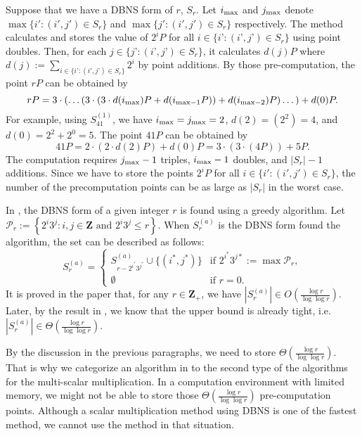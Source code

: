 Suppose that we have a DBNS form of $r$, $S_r$. Let $i_{\rm max}$ and $j_{\rm max}$ denote $\max\{ i' : (i',j') \in S_r \}$ and $\max\{ j' : (i',j') \in S_r \}$ respectively. The method calculates and stores the value of $2^iP$ for all $i \in \{i’ : (i’, j’) \in S_r \}$ using point doubles. Then, for each $j \in \{j’ : (i’, j’) \in S_r \}$, it calculates $d(j)P$ where $d(j) := \sum\limits_{i \in \{i’ : (i',j’) \in S_r\}} 2^i $ by point additions. By those pre-computation, the point $rP$ can be obtained by
$$rP = 3\cdot \left( \dots \left( 3 \cdot \left( 3 \cdot d(i_{\rm max})P + d(i_{\mathrm{max} - 1}P) \right) + d(i_{\mathrm{max} - 2})P \right) \dots \right) + d(0)P.$$
For example, using $S_{41}^{(1)}$, we have $i_{\rm max} = j_{\rm max} = 2$, $d(2) = \left(2^2\right) = 4$, and $d(0) =  2^2 + 2^0 = 5$. The point $41P$ can be obtained by
$$41P = 2 \cdot \left( 2 \cdot d(2)P  \right) + d(0)P = 3 \cdot \left( 3 \cdot \left( 4P \right)  \right) + 5P.$$
The computation requires $j_{\rm max} - 1$ triples, $i_{\rm max} - 1$ doubles, and $|S_r| - 1$ additions. Since we have to store the points $2^iP$ for all $i \in \{i' : (i',j') \in S_r\}$, the number of the precomputation points can be as large as $|S_r|$ in the worst case.

In \cite{dbns2}, the DBNS form of a given integer $r$ is found using a greedy algorithm. Let $\mathcal{P}_r := \left\{ 2^i3^j : i,j \in \mathbf{Z} \text{ and } 2^i3^j \leq r \right\}$. When $S^{(a)}_r$ is the DBNS form found the algorithm, the set can be described as follows:
\[
S^{(a)}_r =
\begin{cases}
S^{(a)}_{r - 2^{i^*}3^{j^*}} \cup \{(i^*, j^*)\} & \text{if } 2^{i^*}3^{j*} := \max \mathcal{P}_r, \\
\emptyset       & \text{if } r = 0.
\end{cases}
\]
It is proved in the paper that, for any $r \in \mathbf{Z}_+$, we have $\left|S_r^{(a)}\right| \in O(\frac{\log r}{\log \log r})$. Later, by the result in \cite{dbns3}, we know that the upper bound is already tight, i.e. $\left|S_r^{(a)}\right| \in \Theta(\frac{\log r}{\log \log r})$.

By the discussion in the previous paragraphs, we need to store $\Theta(\frac{\log r}{\log \log r})$. That is why we categorize an algorithm in \cite{dbns} to the second type of the algorithms for the multi-scalar multiplication. In a computation environment with limited memory, we might not be able to store those $\Theta(\frac{\log r}{\log \log r})$ pre-computation points. Although a scalar multiplication method using DBNS is one of the fastest method, we cannot use the method in that situation.


